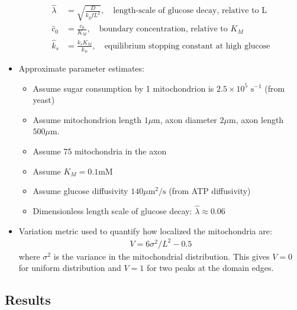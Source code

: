 \documentclass[12pt,letterpaper]{article}
\begin{document}
\begin{itemize}
	\begin{equation*}
	\begin{split}
	\hat{\lambda} & = \sqrt{\frac{D}{k_g f L^2}}, \quad \text{length-scale of glucose decay, relative to L} \\
	\hat{c}_0 & = \frac{c_0}{K_M}, \quad \text{boundary concentration, relative to $K_M$} \\
	\hat{k}_s & = \frac{k_s K_M}{k_w}, \quad \text{equilibrium stopping constant at high glucose}
	\end{split}
	\end{equation*}
	\item Approximate parameter estimates:
	\begin{itemize}
		\item Assume sugar consumption by 1 mitochondrion is $2.5\times 10^5\text{ s}^{-1}$ (from yeast)
		\item Assume mitochondrion length $1\mu$m, axon diameter $2\mu$m, axon length $500\mu\text{m}$.
		\item Assume $75$ mitochondria in the axon
		\item Assume $K_M = 0.1$mM
		\item Assume glucose diffusivity $140\mu\text{m}^2/\text{s}$ (from ATP diffusivity)
		\item Dimensionless length scale of glucose decay: $\hat{\lambda} \approx 0.06$	
	\end{itemize}
	\item Variation metric used to quantify how localized the mitochondria are:
	\begin{equation*}
	\begin{split}
	V = 6 \sigma^2/L^2 - 0.5
	\end{split}
	\end{equation*}
	where $\sigma^2$ is the variance in the mitochondrial distribution. This gives $V=0$ for uniform distribution and $V=1$ for two peaks at the domain edges.
\end{itemize}

\subsection{Results}



\renewcommand\refname{\vspace{-\baselineskip}}

\begin{multicols}{2}
	
\footnotesize
{}

%

\end{multicols}
\end{document}
